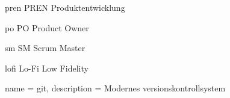 \newacronym
  {pren}                %
  {PREN}                %
  {Produktentwicklung}  %
  
\newacronym
  {po}
  {PO}
  {Product Owner}
  
\newacronym
  {sm}
  {SM}
  {Scrum Master}

\newacronym
  {lofi}
  {Lo-Fi}
  {Low Fidelity}

{
  name = git,
  description = {
    Modernes versionskontrollsystem
  }
}